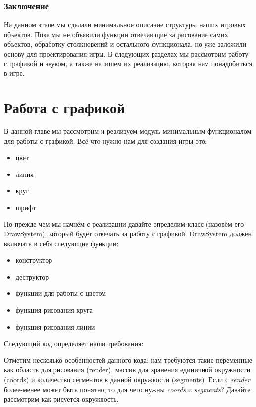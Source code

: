 \subsection{Заключение}
На данном этапе мы сделали минимальное описание структуры наших игровых объектов. Пока мы не объявили 
функции отвечающие за рисование самих объектов, обработку столкновений и остального функционала, но уже 
заложили основу для проектирования игры. В следующих разделах мы рассмотрим работу с графикой и звуком, а 
также напишем их реализацию, которая нам понадобиться в игре.

\pagebreak

\chapter{Работа с графикой}
В данной главе мы рассмотрим и реализуем модуль минимальным функционалом для работы с графикой. 
Всё что нужно нам для создания игры это:
\begin{itemize}\itemsep-5pt
    \item цвет
    \item линия
    \item круг
    \item шрифт
\end{itemize}

Но прежде чем мы начнём с реализации давайте определим класс (назовём его DrawSystem), который будет отвечать 
за работу с графикой. DrawSystem должен включать в себя следующие функции:
\begin{itemize}\itemsep-5pt
    \item конструктор
    \item деструктор
    \item функции для работы с цветом
    \item функция рисования круга
    \item функция рисования линии
\end{itemize}

Следующий код определяет наши требования:


Отметим несколько особенностей данного кода: нам требуются такие переменные как область для рисования 
(render), массив для хранения единичной окружности (coords) и количество сегментов в данной окружности 
(segments). Если с \emph{render} более-менее может быть понятно, то для чего нужны \emph{coords} и 
\emph{segments}? Давайте рассмотрим как рисуется окружность.

